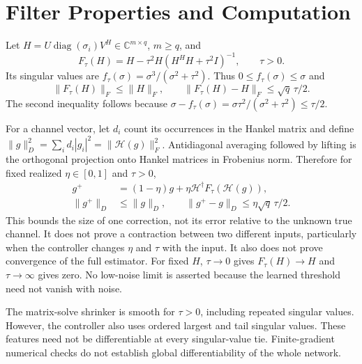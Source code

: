 \documentclass[journal]{IEEEtran}
\newcommand{\Hank}{\mathcal H}
\DeclareMathOperator{\diag}{diag}
\begin{document}
\section{Filter Properties and Computation}
Let $H=U\diag(\sigma_i)V^H\in\mathbb C^{m\times q}$, $m\ge q$, and
\begin{equation}
 F_\tau(H)=H-\tau^2H(H^HH+\tau^2I)^{-1},\qquad\tau>0.
\end{equation}
Its singular values are $f_\tau(\sigma)=\sigma^3/(\sigma^2+\tau^2)$.
Thus $0\le f_\tau(\sigma)\le\sigma$ and
\begin{equation}
 \|F_\tau(H)\|_F\le\|H\|_F,\qquad
 \|F_\tau(H)-H\|_F\le\sqrt q\,\tau/2.
\end{equation}
The second inequality follows because
$\sigma-f_\tau(\sigma)=\sigma\tau^2/(\sigma^2+\tau^2)\le\tau/2$.

For a channel vector, let $d_i$ count its occurrences in the Hankel
matrix and define $\|g\|_D^2=\sum_i d_i|g_i|^2=\|\Hank(g)\|_F^2$.
Antidiagonal averaging followed by lifting is the orthogonal projection
onto Hankel matrices in Frobenius norm. Therefore for fixed realized
$\eta\in[0,1]$ and $\tau>0$,
\begin{align}
 g^+&=(1-\eta)g+\eta\Hank^\dagger F_\tau(\Hank(g)),\\
 \|g^+\|_D&\le\|g\|_D,\qquad
 \|g^+-g\|_D\le\eta\sqrt q\,\tau/2.
\end{align}
This bounds the size of one correction, not its error relative to the
unknown true channel. It does not prove a contraction between two
different inputs, particularly when the controller changes $\eta$ and
$\tau$ with the input. It also does not prove convergence of the full
estimator. For fixed $H$, $\tau\to0$ gives $F_\tau(H)\to H$ and
$\tau\to\infty$ gives zero. No low-noise limit is asserted because
the learned threshold need not vanish with noise.

The matrix-solve shrinker is smooth for $\tau>0$, including repeated
singular values. However, the controller also uses ordered largest and
tail singular values. These features need not be differentiable at every
singular-value tie. Finite-gradient numerical checks do not establish
global differentiability of the whole network.
\end{document}
